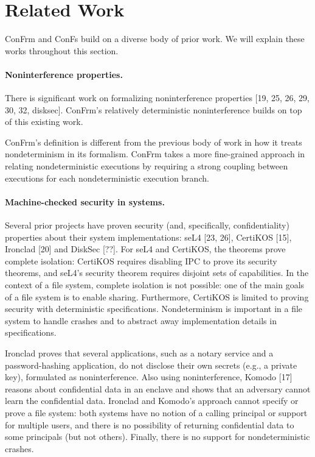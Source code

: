 \section{Related Work}

ConFrm and ConFs build on a diverse body of prior work. We will explain these works throughout this section. 

\paragraph{Noninterference properties.} There is  significant work on formalizing noninterference properties [19, 25, 26, 29, 30, 32, disksec]. ConFrm's relatively deterministic noninterference builds on top of this existing work. 

ConFrm's definition is different from the previous body of work in how it treats nondeterminism in its formalism. ConFrm takes a more fine-grained approach in relating nondeterministic executions by requiring a strong coupling between executions for each nondeterministic execution branch.

\paragraph{Machine-checked security in systems.} 
Several prior
projects have proven security (and, specifically, confidentiality) properties about their system implementations:
seL4 [23, 26], CertiKOS [15], Ironclad [20] and DiskSec [??]. For
seL4 and CertiKOS, the theorems prove complete isolation: CertiKOS requires disabling IPC to prove its security
theorems, and seL4’s security theorem requires disjoint
sets of capabilities. In the context of a file system, complete isolation is not possible: one of the main goals of a
file system is to enable sharing. Furthermore, CertiKOS
is limited to proving security with deterministic specifications. Nondeterminism is important in a file system
to handle crashes and to abstract away implementation
details in specifications.

Ironclad proves that several applications, such as a notary service and a password-hashing application, do not
disclose their own secrets (e.g., a private key), formulated as noninterference. Also using noninterference, Komodo [17] reasons about confidential data in an enclave
and shows that an adversary cannot learn the confidential data. Ironclad and Komodo’s approach cannot specify
or prove a file system: both systems have no notion of a
calling principal or support for multiple users, and there
is no possibility of returning confidential data to some
principals (but not others). Finally, there is no support for
nondeterministic crashes.

